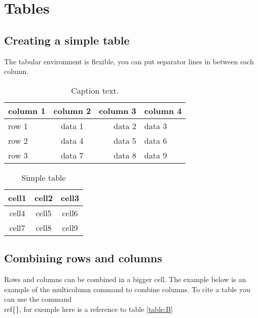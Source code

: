 \documentclass[Theme1]{{template_material/eurostat}}
\begin{document}
\newpage %
\section{Tables}

\subsection{Creating a simple table}
The tabular environment is flexible, you can put separator lines in between each column.

\begin{table}[htbp]
\caption{Caption text.\label{tab1}}

\begin{tabular}{@{}l|crl@{}}
column 1 & column 2  & column 3 &   column 4\\\hline
row 1    & data 1   & data 2  & data 3  \\
row 2    & data 4   & data 5  & data 6  \\
row 3    & data 7   & data 8  & data 9  \\\hline
\end{tabular}
\end{table}

\begin{table}[htbp]
 \caption{Simple table}
 \label{table:A}
    \begin{tabular}{ c|c|c } 
     \hline
     cell1 & cell2 & cell3 \\ 
     \hline
     cell4 & cell5 & cell6 \\ 
     \hline
     cell7 & cell8 & cell9 \\ 
     \hline
    \end{tabular}
\end{table}

\subsection{Combining rows and columns}

Rows and columns can be combined in a bigger cell. The example below is an example of the multicolumn command to combine columns. To cite a table you can use the command \\ref\{\}, for exemple here is a reference to table \ref{table:B}
\end{document}
